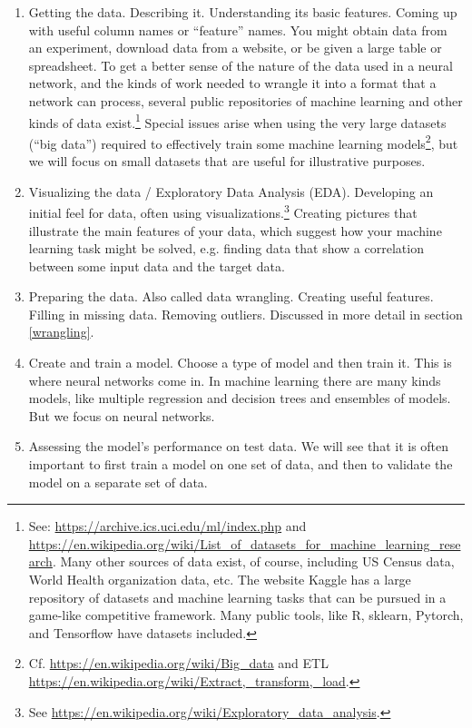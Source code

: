 \begin{enumerate}
\item Getting the data. Describing it. Understanding its basic features. Coming up with useful column names or ``feature'' names. You might obtain data from an experiment, download data from a website, or be given a large table or spreadsheet. To get a better sense of the nature of the data used in a neural network, and the kinds of work needed to wrangle it into a format that a network can process, several public repositories of machine learning and other kinds of data exist.\footnote{See: \url{https://archive.ics.uci.edu/ml/index.php} and \url{https://en.wikipedia.org/wiki/List_of_datasets_for_machine_learning_research}. Many other sources of data exist, of course, including US Census data, World Health organization data, etc. The website Kaggle has a large repository of datasets and machine learning tasks that can be pursued in a game-like competitive framework. Many public tools, like R, sklearn, Pytorch, and Tensorflow have datasets included.}  Special issues arise when using the very large datasets (``big data'') required to effectively train some machine learning models\footnote{Cf. \url{https://en.wikipedia.org/wiki/Big_data} and ETL \url{https://en.wikipedia.org/wiki/Extract,_transform,_load}.}, but we will focus on small datasets that are useful for illustrative purposes. 
\item Visualizing the data / Exploratory Data Analysis (EDA). Developing an initial feel for  data, often using visualizations.\footnote{See \url{https://en.wikipedia.org/wiki/Exploratory_data_analysis}.} Creating pictures that illustrate the main features of your data, which suggest how your machine learning task might be solved, e.g. finding data that show a correlation between some input data and the target data.
\item Preparing the data. Also called data wrangling. Creating useful features. Filling in missing data. Removing outliers. Discussed in more detail in section \ref{wrangling}.
\item Create and train a model. Choose a type of model and then train it. This is where  neural networks come in. In machine learning there are many kinds models, like multiple regression and decision trees and ensembles of models. But we focus on neural networks.
\item Assessing the model's performance on test data. We will see that it is often important to first train a model on one set of data, and then to validate the model on a separate set of data.
\end{enumerate}

